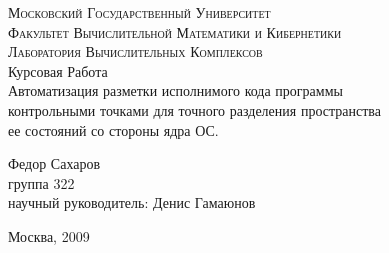 \begin{titlepage}
	\begin{center}
	\textsc{\large{Московский Государственный Университет}
	\\[.5cm]
	\normalsize{Факультет Вычислительной Математики и Кибернетики\\
	Лаборатория Вычислительных Комплексов}}
	\\[4cm]

	\large{Курсовая Работа }\\[1.5cm]

	{\Large {Автоматизация разметки исполнимого кода программы\\ 
	контрольными точками для точного разделения пространства\\ 
	ее состояний со стороны ядра ОС.}} \\[3cm]
	\begin{flushright}
		Федор Сахаров\\
		группа 322\\
		научный руководитель: Денис Гамаюнов
	\end{flushright}
	\vfill
	
	Москва, 2009
	\end{center}

\end{titlepage}

